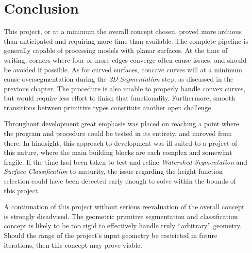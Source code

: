 \chapter{Conclusion}
This project, or at a minimum the overall concept chosen, proved more arduous than anticipated and requiring more time than available.
The complete pipeline is generally capable of processing models with planar surfaces.
At the time of writing, corners where four or more edges converge often cause issues, and should be avoided if possible.
As for curved surfaces, concave curves will at a minimum cause oversegmentation during the \textit{2D Segmentation} step, as discussed in the previous chapter.
The procedure is also unable to properly handle convex curves, but would require less effort to finish that functionality.
Furthermore, smooth transitions between primitive types constitute another open challenge.

Throughout development great emphasis was placed on reaching a point where the program and procedure could be tested in its entirety, and imroved from there.
In hindsight, this approach to development was ill-suited to a project of this nature, where the main building blocks are each complex and somewhat fragile.
If the time had been taken to test and refine \textit{Watershed Segmentation} and \textit{Surface Classification} to maturity, the issue regarding the height function selection could have been detected early enough to solve within the bounds of this project.


A continuation of this project without serious reevaluation of the overall concept is strongly disadvised.
The geometric primitive segmentation and classification concept is likely to be too rigid to effectively handle truly ``arbitrary'' geometry.
Should the range of the project's input geometry be restricted in future iterations, then this concept may prove viable.

